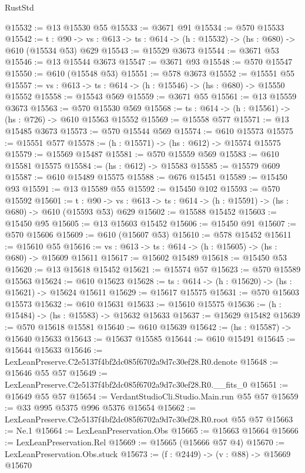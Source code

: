 \begin{lexlean}{RustStd}
\begin{coremodule}
@15532 := @13 @15530 @55
@15533 := @3671 @91
@15534 := @570 @15533
@15542 := {t : @90} ->
  {vs : @613} -> {ts : @614} -> (h : @15532) -> (hs : @680) -> @610 (@15534 @53) @629
@15543 := @15529 @3673
@15544 := @3671 @53
@15546 := @13 @15544 @3673
@15547 := @3671 @93
@15548 := @570 @15547
@15550 := @610 (@15548 @53)
@15551 := @578 @3673
@15552 := @15551 @55
@15557 := {vs : @613} -> {ts : @614} -> (h : @15546) -> (hs : @680) -> @15550 @15552
@15558 := @15543 @569
@15559 := @3671 @55
@15561 := @13 @15559 @3673
@15563 := @570 @15530 @569
@15568 := {ts : @614} -> (h : @15561) -> (hs : @726) -> @610 @15563 @15552
@15569 := @15558 @577
@15571 := @13 @15485 @3673
@15573 := @570 @15544 @569
@15574 := @610 @15573
@15575 := @15551 @577
@15578 := (h : @15571) -> (hs : @612) -> @15574 @15575
@15579 := @15569 @15487
@15581 := @570 @15559 @569
@15583 := @610 @15581 @15575
@15584 := (hs : @612) -> @15583
@15585 := @15579 @609
@15587 := @610 @15489 @15575
@15588 := @676 @15451
@15589 := @15450 @93
@15591 := @13 @15589 @55
@15592 := @15450 @102
@15593 := @570 @15592
@15601 := {t : @90} ->
  {vs : @613} -> {ts : @614} -> (h : @15591) -> (hs : @680) -> @610 (@15593 @53) @629
@15602 := @15588 @15452
@15603 := @15450 @95
@15605 := @13 @15603 @15452
@15606 := @15450 @91
@15607 := @570 @15606
@15609 := @610 (@15607 @53)
@15610 := @578 @15452
@15611 := @15610 @55
@15616 := {vs : @613} -> {ts : @614} -> (h : @15605) -> (hs : @680) -> @15609 @15611
@15617 := @15602 @15489
@15618 := @15450 @53
@15620 := @13 @15618 @15452
@15621 := @15574 @57
@15623 := @570 @15589 @15563
@15624 := @610 @15623
@15628 := {ts : @614} -> (h : @15620) -> (hs : @15621) -> @15624 @15611
@15629 := @15617 @15575
@15631 := @570 @15603 @15573
@15632 := @610 @15631
@15633 := @15610 @15575
@15636 := (h : @15484) -> (hs : @15583) -> @15632 @15633
@15637 := @15629 @15482
@15639 := @570 @15618 @15581
@15640 := @610 @15639
@15642 := (hs : @15587) -> @15640 @15633
@15643 := @15637 @15585
@15644 := @610 @15491
@15645 := @15644 @15633
@15646 := LexLeanPreserve.C2e5137f4bf2dc085f6702a9d7c30ef28.R0.denote
@15648 := @15646 @55 @57
@15649 := LexLeanPreserve.C2e5137f4bf2dc085f6702a9d7c30ef28.R0.__fits_0
@15651 := @15649 @55 @57
@15654 := VerdantStudioCli.Studio.Main.run @55 @57
@15659 := @33 @995 @5375 @996 @5376 @15654
@15662 := LexLeanPreserve.C2e5137f4bf2dc085f6702a9d7c30ef28.R0.root @55 @57
@15663 := Ne.{1}
@15664 := LexLeanPreservation.Obs
@15665 := @15663 @15664
@15666 := LexLeanPreservation.Rel
@15669 := @15665 (@15666 @57 @4)
@15670 := LexLeanPreservation.Obs.stuck
@15673 := (f : @2449) -> (v : @88) -> @15669 @15670

\end{coremodule}
\end{lexlean}
